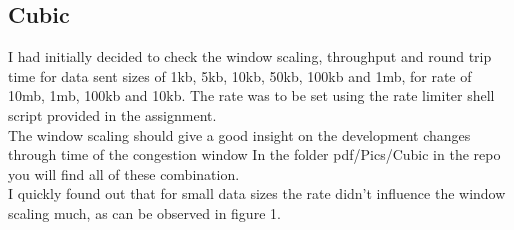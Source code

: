 \documentclass{report}
\begin{document}
\subsection*{Cubic}
I had initially decided to check the window scaling, throughput and round trip time for data sent sizes of 1kb, 5kb, 10kb, 50kb, 100kb and 1mb, for rate of 10mb, 1mb, 100kb and 10kb. The rate was to be set using the rate limiter shell script provided in the assignment.\\
The window scaling should give a good insight on the development changes through time of the congestion window
In the folder pdf/Pics/Cubic in the repo you will find all of these combination.\\
I quickly found out that for small data sizes the rate didn't influence the window scaling much, as can be observed in figure 1.\\
\end{document}
